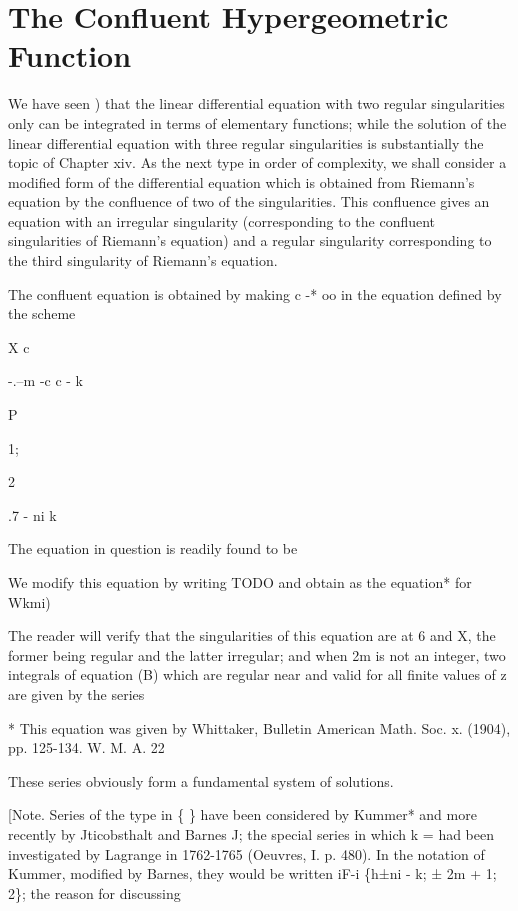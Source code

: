 \chapter{The Confluent Hypergeometric Function}


We have seen ) that the linear differential equation with two
regular singularities only can be integrated in terms of elementary
functions; while the solution of the linear differential equation
with three regular singularities is substantially the topic of Chapter
xiv. As the next type in order of complexity, we shall consider a
modified form of the differential equation which is obtained from
Riemann's equation by the confluence of two of the singularities. This
confluence gives an equation with an irregular singularity
(corresponding to the confluent singularities of Riemann's equation)
and a regular singularity corresponding to the third singularity of
Riemann's equation.

The confluent equation is obtained by making c -* oo in the equation
defined by the scheme

X c

-.--m -c c - k

P

1;

2

.7 - ni k

The equation in question is readily found to be

We modify this equation by writing TODO and obtain as the equation*
for Wkmi)

The reader will verify that the singularities of this equation are at
6 and X, the former being regular and the latter irregular; and when
2m is not an integer, two integrals of equation (B) which are regular
near and valid for all finite values of z are given by the series

* This equation was given by Whittaker, Bulletin American Math. Soc.
x. (1904), pp. 125-134. W. M. A. 22

%
%

These series obviously form a fundamental system of solutions.

[Note. Series of the type in \{ \} have been considered by Kummer* and
more recently by Jticobsthalt and Barnes J; the special series in
which k = had been investigated by Lagrange in 1762-1765 (Oeuvres, I.
p. 480). In the notation of Kummer, modified by Barnes, they would be
written iF-i \{h±ni - k; ± 2m + 1; 2\}; the reason for discussing

